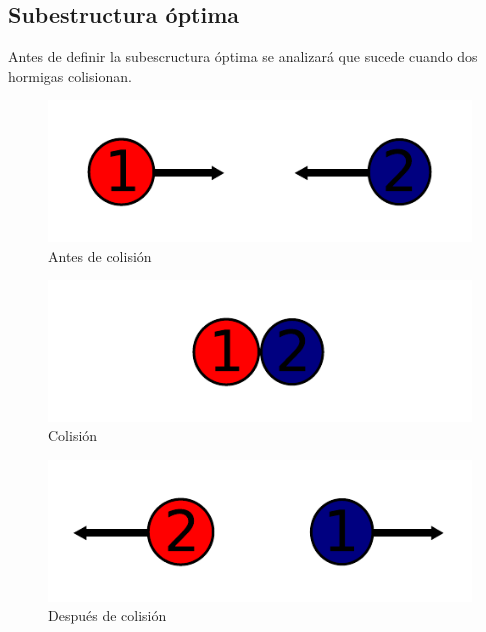 \documentclass[11pt,spanish]{article}
\begin{document}
\subsection{Subestructura óptima}
Antes de definir la subescructura óptima se analizará que sucede cuando dos hormigas colisionan.
\begin{figure}[h]
    \centering
    \includegraphics{hormigas1.pdf}
    \caption{Antes de colisión}
    \label{fig:antes}
\end{figure}
\begin{figure}[h]
    \centering
    \includegraphics{hormigas2.pdf}
    \caption{Colisión}
    \label{fig:durante}
\end{figure}
\begin{figure}[h]
    \centering
    \includegraphics{hormigas3.pdf}
    \caption{Después de colisión}
    \label{fig:despues}
\end{figure}
\\\\\\\\
\end{document}

